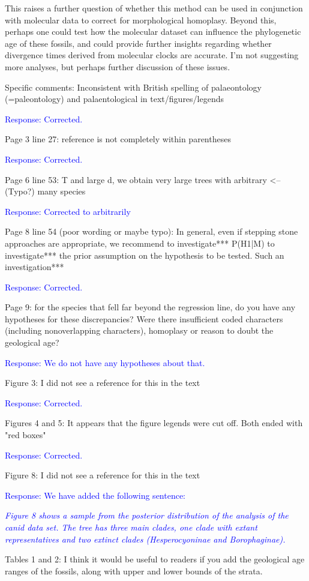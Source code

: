 \documentclass[11pt]{article}
\newcommand{\response}[1]{\medskip{}\textcolor{blue}{{Response: #1}}\medskip{}}
\newcommand{\respquote}[1]{{\medskip{}\textcolor{blue}{{\it #1}}\medskip{}}}
\begin{document}
This raises a further question of whether this method can be used in conjunction with molecular data to correct for morphological homoplasy. Beyond this, perhaps one could test how the molecular dataset can influence the phylogenetic age of these fossils, and could provide further insights regarding whether divergence times derived from molecular clocks are accurate. I'm not suggesting more analyses, but perhaps further discussion of these issues.

Specific comments:
Inconsistent with British spelling of palaeontology (=paleontology) and palaentological in text/figures/legends

\response{Corrected.}

Page 3 line 27: reference is not completely within parentheses

\response{Corrected.}

Page 6 line 53: T and large d, we obtain very large trees with arbitrary <--(Typo?) many species

\response{Corrected to arbitrarily}

Page 8 line 54 (poor wording or maybe typo): In general, even if stepping stone approaches are appropriate, we recommend to investigate*** P(H1|M) to investigate*** the prior assumption on the hypothesis to be tested. Such an investigation***

\response{Corrected.}

Page 9: for the species that fell far beyond the regression line, do you have any hypotheses for these discrepancies? Were there insufficient coded characters (including nonoverlapping characters), homoplasy or reason to doubt the geological age?

\response{We do not have any hypotheses about that.}

Figure 3: I did not see a reference for this in the text

\response{Corrected.}

Figures 4 and 5: It appears that the figure legends were cut off. Both ended with "red boxes"

\response{Corrected.}

Figure 8: I did not see a reference for this in the text

\response{We have added the following sentence:}

\respquote{Figure 8 shows a sample from the posterior distribution of the analysis of the canid data set. The tree has three main clades, one clade with extant representatives and two extinct clades ({\it Hesperocyoninae} and {\it Borophaginae}). 
}

Tables 1 and 2: I think it would be useful to readers if you add the geological age ranges of the fossils, along with upper and lower bounds of the strata.




\end{document}
